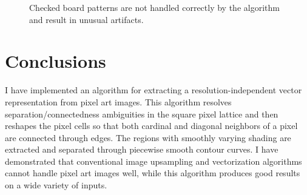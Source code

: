 \documentclass[]{usiinfbachelorproject}
\begin{document}
 \begin{figure}[ht]
	\centering
	\caption{Checked board patterns are not handled correctly by the algorithm and result in unusual artifacts.}
	\label{fig:checked}
\end{figure}

\newpage
\section{Conclusions} \label{sec:conclusions}

I have implemented an algorithm for extracting a resolution-independent vector representation from pixel art images. This algorithm resolves separation/connectedness ambiguities in the square pixel lattice and then reshapes the pixel cells so that both cardinal and diagonal neighbors of a pixel are connected through edges. The regions with smoothly varying shading are extracted and separated through piecewise smooth contour curves. I have demonstrated that conventional image upsampling and vectorization algorithms cannot handle pixel art images well, while this algorithm produces good results on a wide variety of inputs.
\end{document}
